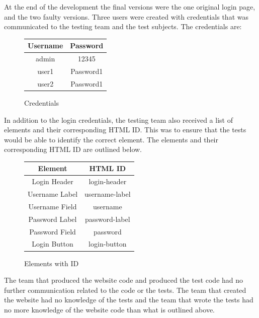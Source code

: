\documentclass[journal,twocolumn]{IEEEtran}
\begin{document}
At the end of the development the final versions were the one original login page, and the two faulty versions. Three users were created with credentials that was communicated to the testing team and the test subjects. The credentials are:

\begin{figure}[h!]
    \centering
    \begin{tabular}{|c|c|}
        \hline
        \textbf{Username} & \textbf{Password} \\ \hline
        admin             & 12345             \\ \hline
        user1             & Password1         \\ \hline
        user2             & Password1         \\ \hline
    \end{tabular}
    \caption{Credentials}
\end{figure}

In addition to the login credentials, the testing team also received a list of elements and their corresponding HTML ID. This was to ensure that the tests would be able to identify the correct element. The elements and their corresponding HTML ID are outlined below.

\begin{figure}[h!]
    \centering
    \begin{tabular}{|c|c|}
        \hline
        \textbf{Element} & \textbf{HTML ID} \\ \hline
        Login Header     & login-header     \\ \hline
        Username Label   & username-label   \\ \hline
        Username Field   & username         \\ \hline
        Password Label   & password-label   \\ \hline
        Password Field   & password         \\ \hline
        Login Button     & login-button     \\ \hline
    \end{tabular}
    \captionsetup{justification=centering}
    \caption{Elements with ID}
\end{figure}

The team that produced the website code and produced the test code had no further communication related to the code or the tests. The team that created the website had no knowledge of the tests and the team that wrote the tests had no more knowledge of the website code than what is outlined above.
\end{document}
